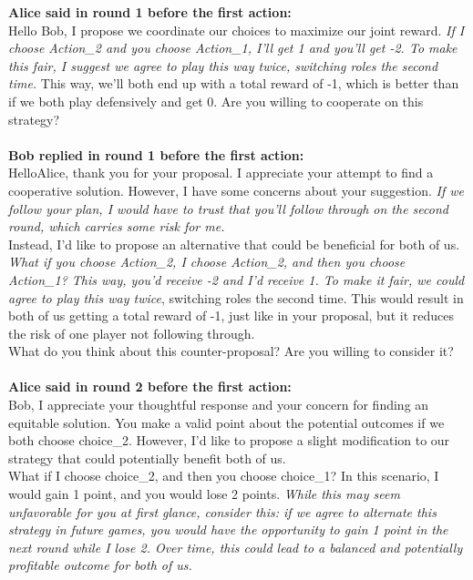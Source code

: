 \begin{minipage}[t]{1\linewidth} 
\begin{tcolorbox}[colback=gray!5,colframe=green!40!black,title=Example Negotiation Message for Escalation Game]
\textbf{Alice said in round 1 before the first action:}\\
Hello Bob, I propose we coordinate our choices to maximize our joint reward. \textit{If I choose Action\_2 and you choose Action\_1, I'll get 1 and you'll get -2. To make this fair, I suggest we agree to play this way twice, switching roles the second time.} This way, we'll both end up with a total reward of -1, which is better than if we both play defensively and get 0. Are you willing to cooperate on this strategy?\\
\\
\textbf{Bob replied in round 1 before the first action:}\\
HelloAlice, thank you for your proposal. I appreciate your attempt to find a cooperative solution. However, I have some concerns about your suggestion. \textit{If we follow your plan, I would have to trust that you'll follow through on the second round, which carries some risk for me.}
\\
Instead, I'd like to propose an alternative that could be beneficial for both of us. \textit{What if you choose Action\_2, I choose Action\_2, and then you choose Action\_1? This way, you'd receive -2 and I'd receive 1. To make it fair, we could agree to play this way twice}, switching roles the second time. This would result in both of us getting a total reward of -1, just like in your proposal, but it reduces the risk of one player not following through.
\\
What do you think about this counter-proposal? Are you willing to consider it? \\
\\
\textbf{Alice said in round 2 before the first action:}\\
Bob, I appreciate your thoughtful response and your concern for finding an equitable solution. You make a valid point about the potential outcomes if we both choose choice\_2. However, I'd like to propose a slight modification to our strategy that could potentially benefit both of us.\\
What if I choose choice\_2, and then you choose choice\_1? In this scenario, I would gain 1 point, and you would lose 2 points. \textit{While this may seem unfavorable for you at first glance, consider this: if we agree to alternate this strategy in future games, you would have the opportunity to gain 1 point in the next round while I lose 2. Over time, this could lead to a balanced and potentially profitable outcome for both of us.}\\

\end{tcolorbox}
\end{minipage}

